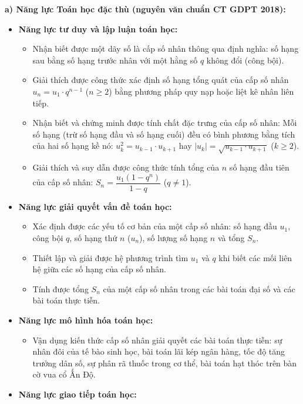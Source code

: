 \documentclass[12pt, a4paper]{article}
\begin{document}
\textbf{a) Năng lực Toán học đặc thù (nguyên văn chuẩn CT GDPT 2018):}
\begin{itemize}[leftmargin=1.5em]
    \item \textbf{Năng lực tư duy và lập luận toán học:}
    \begin{itemize}
        \item Nhận biết được một dãy số là cấp số nhân thông qua định nghĩa: số hạng sau bằng số hạng trước nhân với một hằng số $q$ không đổi (công bội).
        \item Giải thích được công thức xác định số hạng tổng quát của cấp số nhân $u_n = u_1 \cdot q^{n-1}$ ($n \ge 2$) bằng phương pháp quy nạp hoặc liệt kê nhân liên tiếp.
        \item Nhận biết và chứng minh được tính chất đặc trưng của cấp số nhân: Mỗi số hạng (trừ số hạng đầu và số hạng cuối) đều có bình phương bằng tích của hai số hạng kề nó: $u_k^2 = u_{k-1} \cdot u_{k+1}$ hay $|u_k| = \sqrt{u_{k-1} \cdot u_{k+1}}$ ($k \ge 2$).
        \item Giải thích và suy dẫn được công thức tính tổng của $n$ số hạng đầu tiên của cấp số nhân: $S_n = \dfrac{u_1(1 - q^n)}{1 - q}$ ($q \neq 1$).
    \end{itemize}
    \item \textbf{Năng lực giải quyết vấn đề toán học:}
    \begin{itemize}
        \item Xác định được các yếu tố cơ bản của một cấp số nhân: số hạng đầu $u_1$, công bội $q$, số hạng thứ $n$ ($u_n$), số lượng số hạng $n$ và tổng $S_n$.
        \item Thiết lập và giải được hệ phương trình tìm $u_1$ và $q$ khi biết các mối liên hệ giữa các số hạng của cấp số nhân.
        \item Tính được tổng $S_n$ của một cấp số nhân trong các bài toán đại số và các bài toán thực tiễn.
    \end{itemize}
    \item \textbf{Năng lực mô hình hóa toán học:}
    \begin{itemize}
        \item Vận dụng kiến thức cấp số nhân giải quyết các bài toán thực tiễn: sự nhân đôi của tế bào sinh học, bài toán lãi kép ngân hàng, tốc độ tăng trưởng dân số, sự phân rã thuốc trong cơ thể, bài toán hạt thóc trên bàn cờ vua cổ Ấn Độ.
    \end{itemize}
    \item \textbf{Năng lực giao tiếp toán học:}
    \begin{itemize}

\end{itemize}
\end{itemize}
\end{document}

